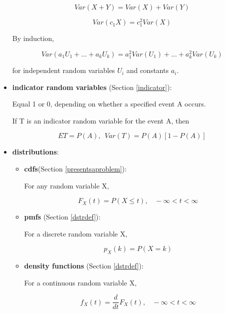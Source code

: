 \begin{itemize}
\begin{equation}
Var(X+Y) = Var(X) + Var(Y)
\end{equation}

\begin{equation}
Var(c_1 X) = c^2_1 Var(X)
\end{equation}

By induction,

\begin{equation}
Var(a_1 U_1 + ... + a_k U_k) = a^2_1 Var(U_1) + ... + a^2_k Var(U_k)
\end{equation}

for independent random variables $U_i$ and constants $a_i$.

\item {\bf indicator random variables} (Section \ref{indicator}):

Equal 1 or 0, depending on whether a specified event A occurs.

If T is an indicator random variable for the event A, then

\begin{equation}
ET = P(A), ~~ Var(T) = P(A) [1-P(A)]
\end{equation}

\item {\bf distributions}:

   \begin{itemize}

   \item {\bf cdfs}(Section \ref{presentsaproblem}):

   For any random variable X,

   \begin{equation}
   F_X(t) = P(X \leq t),  ~~~~ -\infty < t < \infty
   \end{equation}

   \item {\bf pmfs} (Section \ref{dstrdef}): 

   For a discrete random variable X,

   \begin{equation}
   p_X(k) = P(X = k)
   \end{equation}

   \item {\bf density functions} (Section \ref{dstrdef}): 

   For a continuous random variable X,

   \begin{equation}
   f_X(t) = \frac{d}{dt} F_X(t), ~~~~ -\infty < t < \infty
   \end{equation}


\end{itemize}
\end{itemize}
